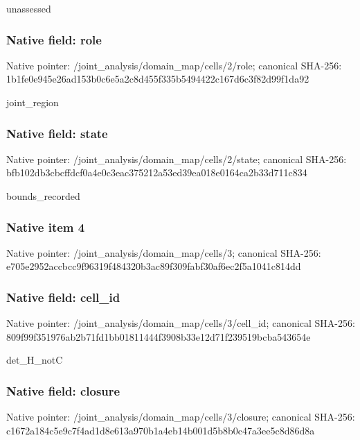 \documentclass[10pt,a4paper]{article}
\begin{document}
\begingroup\raggedright\sloppy unassessed\par\endgroup

\subsubsection{Native field: role}
Native pointer: /joint\_\allowbreak{}analysis/domain\_\allowbreak{}map/cells/2/role; canonical SHA-256: 1b1fe0e945e26ad153b0c6e5a2c8d455f335b5494422c167d6c3f82d99f1da92

\begingroup\raggedright\sloppy joint\_\allowbreak{}region\par\endgroup

\subsubsection{Native field: state}
Native pointer: /joint\_\allowbreak{}analysis/domain\_\allowbreak{}map/cells/2/state; canonical SHA-256: bfb102db3cbcffdcf0a4e0c3eac375212a53ed39ea018e0164ca2b33d711c834

\begingroup\raggedright\sloppy bounds\_\allowbreak{}recorded\par\endgroup

\subsubsection{Native item 4}
Native pointer: /joint\_\allowbreak{}analysis/domain\_\allowbreak{}map/cells/3; canonical SHA-256: e705e2952accbcc9f96319f484320b3ac89f309fabf30af6ec2f5a1041c814dd

\subsubsection{Native field: cell\_\allowbreak{}id}
Native pointer: /joint\_\allowbreak{}analysis/domain\_\allowbreak{}map/cells/3/cell\_\allowbreak{}id; canonical SHA-256: 809f99f351976ab2b71fd1bb01811444f3908b33e12d71f239519bcba543654e

\begingroup\raggedright\sloppy det\_\allowbreak{}H\_\allowbreak{}notC\par\endgroup

\subsubsection{Native field: closure}
Native pointer: /joint\_\allowbreak{}analysis/domain\_\allowbreak{}map/cells/3/closure; canonical SHA-256: c1672a184c5e9c7f4ad1d8e613a970b1a4eb14b001d5b8b0c47a3ee5c8d86d8a
\end{document}
